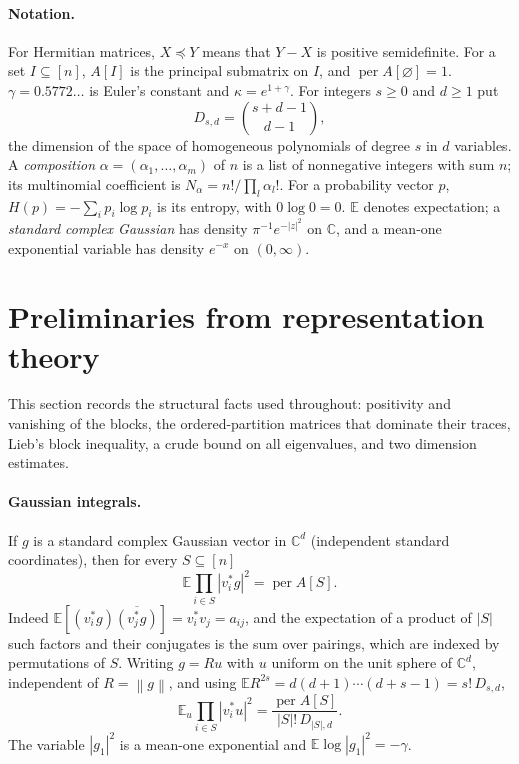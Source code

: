 \documentclass[11pt,a4paper]{article}
\theoremstyle{remark}
\newcommand{\per}{\operatorname{per}}
\newcommand{\norm}[1]{\left\lVert#1\right\rVert}
\newcommand{\C}{\mathbb C}
\newcommand{\E}{\mathbb E}
\begin{document}
\paragraph{Notation.} For Hermitian matrices, $X\preceq Y$ means that $Y-X$ is positive semidefinite. For a set $I\subseteq[n]$, $A[I]$ is the principal submatrix on $I$, and $\per A[\varnothing]=1$. $\gamma=0.5772\dots$ is Euler's constant and $\kappa=e^{1+\gamma}$. For integers $s\ge0$ and $d\ge1$ put
\[
 D_{s,d}=\binom{s+d-1}{d-1},
\]
the dimension of the space of homogeneous polynomials of degree $s$ in $d$ variables. A \emph{composition} $\alpha=(\alpha_1,\dots,\alpha_m)$ of $n$ is a list of nonnegative integers with sum $n$; its multinomial coefficient is $N_\alpha=n!/\prod_l\alpha_l!$. For a probability vector $p$, $H(p)=-\sum_ip_i\log p_i$ is its entropy, with $0\log0=0$. $\E$ denotes expectation; a \emph{standard complex Gaussian} has density $\pi^{-1}e^{-|z|^2}$ on $\C$, and a mean-one exponential variable has density $e^{-x}$ on $(0,\infty)$.

\section{Preliminaries from representation theory}\label{sec:prelim}
This section records the structural facts used throughout: positivity and vanishing of the blocks, the ordered-partition matrices that dominate their traces, Lieb's block inequality, a crude bound on all eigenvalues, and two dimension estimates.

\paragraph{Gaussian integrals.} If $g$ is a standard complex Gaussian vector in $\C^d$ (independent standard coordinates), then for every $S\subseteq[n]$
\begin{equation}\label{eq:wick}
 \E\prod_{i\in S}|v_i^*g|^2=\per A[S].
\end{equation}
Indeed $\E[(v_i^*g)\overline{(v_j^*g)}]=v_i^*v_j=a_{ij}$, and the expectation of a product of $|S|$ such factors and their conjugates is the sum over pairings, which are indexed by permutations of $S$. Writing $g=Ru$ with $u$ uniform on the unit sphere of $\C^d$, independent of $R=\norm g$, and using $\E R^{2s}=d(d+1)\cdots(d+s-1)=s!\,D_{s,d}$,
\begin{equation}\label{eq:sphere}
 \E_u\prod_{i\in S}|v_i^*u|^2=\frac{\per A[S]}{|S|!\,D_{|S|,d}} .
\end{equation}
The variable $|g_1|^2$ is a mean-one exponential and $\E\log|g_1|^2=-\gamma$.
\end{document}
